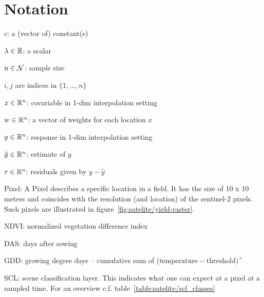 \chapter*{Notation}
\label{c:Notation}

$c$: a (vector of) constant(s)

$\lambda \in \mathbb{R}$: a scalar

$n\in \operatorname{\mathcal{N}}$: sample size

$i,j$ are indices in $\{1,\dots,n\}$

$x\in \mathbb{R}^n$: covariable in 1-dim interpolation setting

$w \in \mathbb{R}^n$: a vector of weights for each location $x$

$y\in \mathbb{R}^n$: response in 1-dim interpolation setting

$\hat y\in \mathbb{R}^n$: estimate of $y$

$r \in \mathbb{R}^n$: residuals given by $y - \hat y$



Pixel: A Pixel describes a specific location in a field. It has the size of 10 x 10 meters and coincides with the resolution (and location) of the sentinel-2 pixels. Such pixels are illustrated in figure~\ref{fig:satelite/yield-raster}.

NDVI: normalized vegetation difference index

DAS: days after sowing

GDD: growing degree days -- cumulative sum of ($\text{temperature}-\text{threshold})^+$

SCL: scene classification layer. This indicates what one can expect at a pixel at a sampled time. For an overview c.f. table~\ref{table:satelite/scl_classes}

